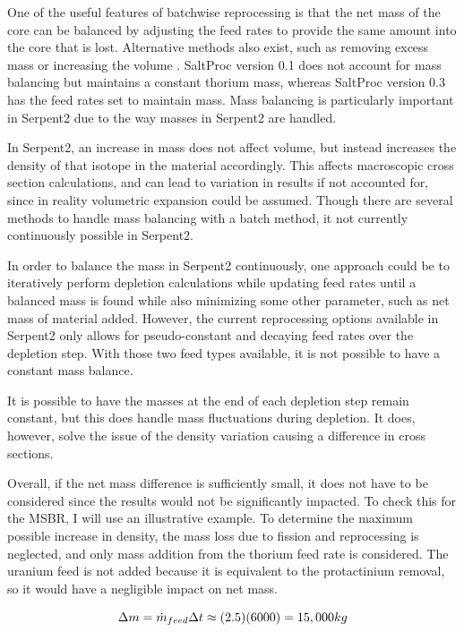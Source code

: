 One of the useful features of batchwise reprocessing is that the net mass of the core can be balanced by adjusting the feed rates to provide the same amount into the core that is lost. Alternative methods also exist, such as removing excess mass or increasing the volume \cite{ridley_method_2017}. SaltProc version 0.1 does not account for mass balancing but maintains a constant thorium mass, whereas SaltProc version 0.3 has the feed rates set to maintain mass. Mass balancing is particularly important in Serpent2 due to the way masses in Serpent2 are handled.

In Serpent2, an increase in mass does not affect volume, but instead increases the density of that isotope in the material accordingly. This affects macroscopic cross section calculations, and can lead to variation in results if not accounted for, since in reality volumetric expansion could be assumed. Though there are several methods to handle mass balancing with a batch method, it not currently continuously possible in Serpent2.

In order to balance the mass in Serpent2 continuously, one approach could be to iteratively perform depletion calculations while updating feed rates until a balanced mass is found while also minimizing some other parameter, such as net mass of material added. However, the current reprocessing options available in Serpent2 only allows for pseudo-constant and decaying feed rates over the depletion step. With those two feed types available, it is not possible to have a constant mass balance.

It is possible to have the masses at the end of each depletion step remain constant, but this does handle mass fluctuations during depletion. It does, however, solve the issue of the density variation causing a difference in cross sections.

Overall, if the net mass difference is sufficiently small, it does not have to be considered since the results would not be significantly impacted. To check this for the MSBR, I will use an illustrative example. To determine the maximum possible increase in density, the mass loss due to fission and reprocessing is neglected, and only mass addition from the thorium feed rate is considered. The uranium feed is not added because it is equivalent to the protactinium removal, so it would have a negligible impact on net mass.

\begin{equation} \hfill
\Delta m = \Dot{m}_{feed} \Delta t \approx (2.5)(6000) = 15,000 kg
\hfill\label{eq:m_gain} \end{equation}

